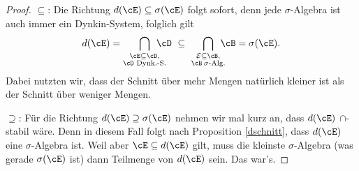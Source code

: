 \begin{proof}
\glqq $\subseteq$\grqq: Die Richtung $d(\cE) \subseteq \sigma(\cE)$ folgt sofort, denn jede $\sigma$-Algebra ist auch immer ein Dynkin-System, folglich gilt \[d(\cE) = \bigcap\limits_{\substack{\cE \subseteq \cD,\\ \cD \text{ Dynk.-S.}}} \! \! \! \! \! \! \! \cD \,\,\subseteq \,\,\bigcap\limits_{\substack{\mathcal E \subseteq \cB, \\ \cB \: \sigma \text{-Alg.}}} \! \! \! \! \cB= \sigma(\cE) .\]
	Dabei nutzten wir, dass der Schnitt \"uber mehr Mengen nat\"urlich kleiner ist als der Schnitt \"uber weniger Mengen.\smallskip
	
\glqq $\supseteq$\grqq: Für die Richtung $d(\cE) \supseteq \sigma(\cE)$ nehmen wir mal kurz an, dass $d(\cE)$ $\cap$-stabil w\"are. Denn in diesem Fall folgt nach Proposition \ref{dschnitt}, dass $d(\cE)$ eine $\sigma$-Algebra ist. Weil aber $\cE \subseteq d(\cE)$ gilt, muss die kleinste $\sigma$-Algebra (was gerade $\sigma(\cE)$ ist) dann Teilmenge von $d(\cE)$ sein. Das war's.\smallskip 
	

\end{proof}
